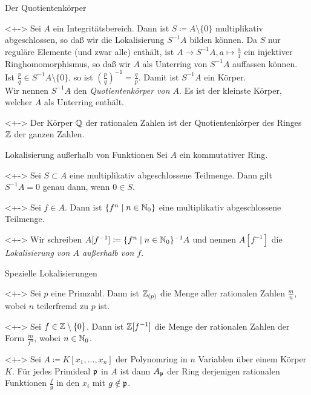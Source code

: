 \begin{frame}{Der Quotientenkörper}
	\begin{example}<+->
		Sei \(A\) ein Integritätsbereich. Dann ist \(S \coloneqq A \setminus \{0\}\) multiplikativ
		abgeschlossen, so daß wir die Lokalisierung \(S^{-1} A\) bilden können. Da \(S\) nur reguläre Elemente (und zwar
		alle) enthält, ist \(A \to S^{-1} A, a \mapsto \frac a 1\) ein injektiver Ringhomomorphismus, so daß
		wir \(A\) als Unterring von \(S^{-1} A\) auffassen können.
		\\
		Ist \(\frac p q \in S^{-1} A \setminus \{0\}\), so ist \((\frac p q)^{-1} = \frac q p\). Damit ist \(S^{-1} A\) ein
		Körper.
		\\
		Wir nennen \(S^{-1} A\) den \emph{Quotientenkörper von \(A\)}. Es ist der kleinste Körper, welcher \(A\) als
		Unterring enthält.
	\end{example}
	\begin{example}<+->
		Der Körper \(\mathbb Q\) der rationalen Zahlen ist der Quotientenkörper des Ringes \(\mathbb Z\) der ganzen Zahlen.
	\end{example}
\end{frame}

\begin{frame}{Lokalisierung außerhalb von Funktionen}
	Sei \(A\) ein kommutativer Ring.
	\begin{example}<+->
		Sei \(S \subset A\) eine multiplikativ abgeschlossene Teilmenge. Dann gilt \(S^{-1} A = 0\) genau dann, wenn
		\(0 \in S\).
	\end{example}
	\begin{example}<+->
		Sei \(f \in A\). Dann ist \(\{f^n \mid n \in \mathbb N_0\}\) eine multiplikativ abgeschlossene Teilmenge.
	\end{example}
	\begin{notation}<+->
		Wir schreiben \(A[f^{-1}] \coloneqq \{f^n \mid n \in \mathbb N_0\}^{-1} A\) und nennen \(A[f^{-1}]\) die
		\emph{Lokalisierung von \(A\) außerhalb von \(f\)}.
	\end{notation}
\end{frame}

\begin{frame}{Spezielle Lokalisierungen}
	\begin{example}<+->
		Sei \(p\) eine Primzahl. Dann ist \(\mathbb Z_{(p)}\) die Menge aller rationalen Zahlen \(\frac m n\), wobei
		\(n\) teilerfremd zu \(p\) ist.
	\end{example}
	\begin{example}<+->
		Sei \(f \in \mathbb Z \setminus \{0\}\). Dann ist \(\mathbb Z[f^{-1}]\) die Menge der rationalen Zahlen der Form
		\(\frac m {f^n}\), wobei \(n \in \mathbb N_0\).
	\end{example}
	\begin{example}<+->
		Sei \(A \coloneqq K[x_1, \dotsc, x_n]\) der Polynomring in \(n\) Variablen über einem Körper \(K\). Für jedes
		Primideal \(\mathfrak{p}\) in \(A\) ist dann \(A_{\mathfrak{p}}\) der Ring derjenigen rationalen Funktionen \(\frac f g\)
		in den \(x_i\) mit \(g \notin \mathfrak{p}\).
	\end{example}
\end{frame}


